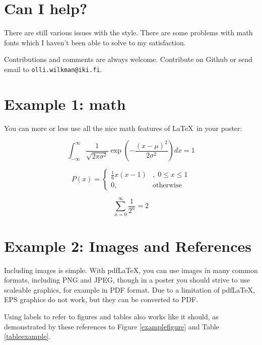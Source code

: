 \documentclass[a0paper,smallertitle]{HYposter}
\newcommand{\url}[1]{\texttt{#1}}
\begin{document}
\section*{Can I help?}

There are still various issues with the style. There are some problems with
math fonts which I haven't been able to solve to my satisfaction.

Contributions and comments are always welcome. Contribute on Github or send
email to \url{olli.wilkman@iki.fi}.



\section*{Example 1: math}
You can more or less use all the nice math features of \LaTeX~in your poster:

\begin{equation}
    \int_{-\infty}^{\infty} \frac{1}{\sqrt{2 \pi \sigma^2}} \exp\left(-\frac{(x - \mu)^2}{2 \sigma^2} \right) dx = 1
\end{equation}

\begin{equation}
    P(x) = \left\{ \begin{array}{lr} \frac{1}{6}x(x-1)&,\; 0 \leq x \leq 1 \\ 0, & \text{otherwise}  \end{array} \right.
\end{equation}

\begin{equation}
    \sum_{n=0}^\infty \frac{1}{2^n} = 2
\end{equation}



\section*{Example 2: Images and References}

Including images is simple. With pdf\LaTeX, you can use images in many common
formats, including PNG and JPEG, though in a poster you should strive to use
scaleable graphics, for example in PDF format. Due to a limitation of
pdf\LaTeX, EPS graphics do not work, but they can be converted to PDF.
    
Using labels to refer to figures and tables also works like it should, as
demonstrated by these references to Figure \ref{examplefigure} and Table
\ref{tableexample}.
\end{document}
